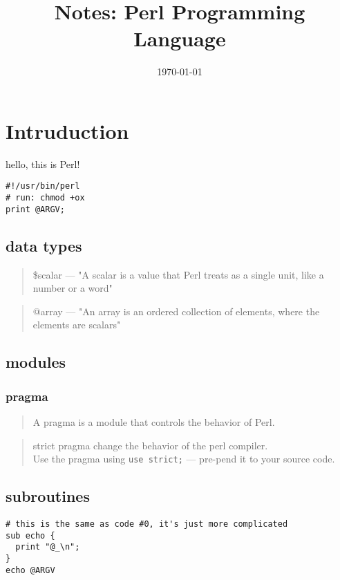 \documentclass[captions=tableheading]{article}
\date{\today}
\title{Notes: Perl Programming Language}
\begin{document}
\maketitle
\tableofcontents

\section{Intruduction}
\label{sec:orgd3df6ce}
hello, this is Perl!

\begin{verbatim}
#!/usr/bin/perl
# run: chmod +ox
print @ARGV;
\end{verbatim}

\subsection{data types}
\label{sec:org85bb76b}
\begin{quote}
\$scalar --- "A scalar is a value that Perl treats as a single unit, like a number or a word"
\end{quote}

\begin{quote}
@array --- "An array is an ordered collection of elements, where the elements are scalars"
\end{quote}

\subsection{modules}
\label{sec:org08f3623}
\subsubsection{pragma}
\label{sec:org8d3c8c1}
\begin{quote}
A pragma is a module that controls the behavior of Perl. 
\end{quote}

\begin{quote}
strict pragma change the behavior of the perl compiler. \\
Use the pragma using \texttt{use strict;} --- pre-pend it to your source code.
\end{quote}

\subsection{subroutines}
\label{sec:org0710fc6}
\begin{verbatim}
# this is the same as code #0, it's just more complicated
sub echo {
  print "@_\n";
}
echo @ARGV
\end{verbatim}
\end{document}
